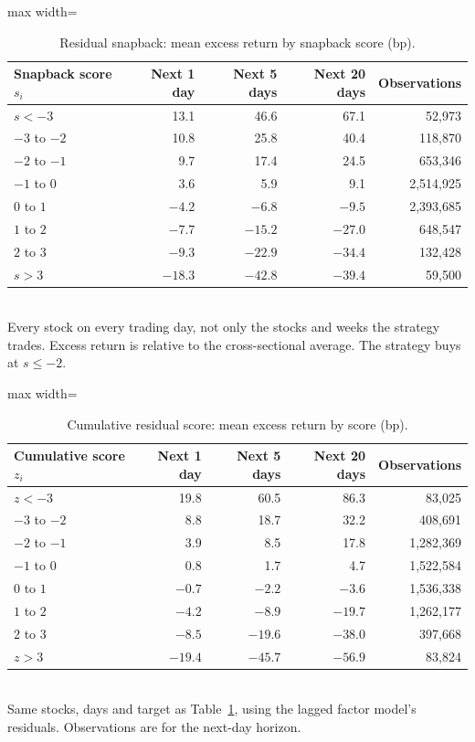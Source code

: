 \documentclass[12pt,letterpaper]{article}
\begin{document}
\begin{table}[!htbp]
\centering
\caption{Residual snapback: mean excess return by snapback score (bp).}
\label{tab:calibration-snap}
\begin{adjustbox}{max width=\linewidth}
\begin{tabular}{lrrrr}
\toprule
Snapback score $s_i$ & Next 1 day & Next 5 days & Next 20 days & Observations \\
\midrule
$s < -3$ & 13.1 & 46.6 & 67.1 & 52,973 \\
$-3$ to $-2$ & 10.8 & 25.8 & 40.4 & 118,870 \\
$-2$ to $-1$ & 9.7 & 17.4 & 24.5 & 653,346 \\
$-1$ to $0$ & 3.6 & 5.9 & 9.1 & 2,514,925 \\
$0$ to $1$ & $-4.2$ & $-6.8$ & $-9.5$ & 2,393,685 \\
$1$ to $2$ & $-7.7$ & $-15.2$ & $-27.0$ & 648,547 \\
$2$ to $3$ & $-9.3$ & $-22.9$ & $-34.4$ & 132,428 \\
$s > 3$ & $-18.3$ & $-42.8$ & $-39.4$ & 59,500 \\
\bottomrule
\end{tabular}
\end{adjustbox}
\\[4pt]
\small Every stock on every trading day, not only the stocks and weeks the strategy trades. Excess return is relative to the cross-sectional average. The strategy buys at $s \le -2$.
\end{table}

\begin{table}[!htbp]
\centering
\caption{Cumulative residual score: mean excess return by score (bp).}
\label{tab:calibration-cumulative}
\begin{adjustbox}{max width=\linewidth}
\begin{tabular}{lrrrr}
\toprule
Cumulative score $z_i$ & Next 1 day & Next 5 days & Next 20 days & Observations \\
\midrule
$z < -3$ & 19.8 & 60.5 & 86.3 & 83,025 \\
$-3$ to $-2$ & 8.8 & 18.7 & 32.2 & 408,691 \\
$-2$ to $-1$ & 3.9 & 8.5 & 17.8 & 1,282,369 \\
$-1$ to $0$ & 0.8 & 1.7 & 4.7 & 1,522,584 \\
$0$ to $1$ & $-0.7$ & $-2.2$ & $-3.6$ & 1,536,338 \\
$1$ to $2$ & $-4.2$ & $-8.9$ & $-19.7$ & 1,262,177 \\
$2$ to $3$ & $-8.5$ & $-19.6$ & $-38.0$ & 397,668 \\
$z > 3$ & $-19.4$ & $-45.7$ & $-56.9$ & 83,824 \\
\bottomrule
\end{tabular}
\end{adjustbox}
\\[4pt]
\small Same stocks, days and target as Table~\ref{tab:calibration-snap}, using the lagged factor model's residuals. Observations are for the next-day horizon.
\end{table}
\end{document}
